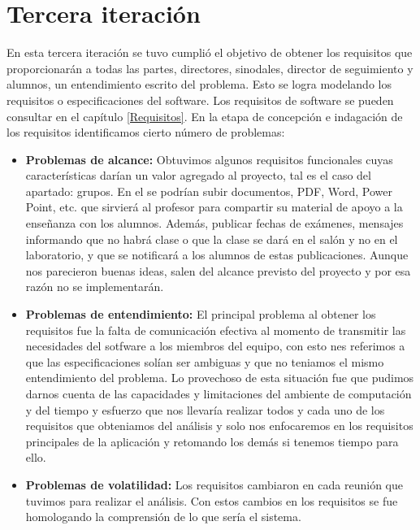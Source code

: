 \section{Tercera iteración}
\noindent
En esta tercera iteración se tuvo cumplió el objetivo de obtener los requisitos que proporcionarán a todas las partes, directores, sinodales, director de seguimiento y alumnos, un entendimiento escrito del problema. Esto se logra modelando los requisitos o especificaciones del software. Los requisitos de software se pueden consultar en el capítulo \ref{Requisitos}.
En la etapa de concepción e indagación de los requisitos identificamos cierto número de problemas:
\begin{itemize}
	\item \textbf{Problemas de alcance:} Obtuvimos algunos requisitos funcionales cuyas características darían un valor agregado al proyecto, tal es el caso del apartado: grupos. En el se podrían subir documentos, PDF, Word, Power Point, etc. que sirvierá al profesor para compartir su material de apoyo a la enseñanza con los alumnos. Además, publicar fechas de exámenes, mensajes informando que no habrá clase o que la clase se dará en el salón y no en el laboratorio, y que se notificará a los alumnos de estas publicaciones. Aunque nos parecieron buenas ideas, salen del alcance previsto del proyecto y por esa razón no se implementarán.
	\item \textbf{Problemas de entendimiento:} El principal problema al obtener los requisitos fue la falta de comunicación efectiva al momento de transmitir las necesidades del sotfware a los miembros del equipo, con esto nes referimos a que las especificaciones solían ser ambiguas y que no teniamos el mismo entendimiento del problema. Lo provechoso de esta situación fue que pudimos darnos cuenta de las capacidades y limitaciones del ambiente de computación y del tiempo y esfuerzo que nos llevaría realizar todos y cada uno de los requisitos que obteniamos del análisis y solo nos enfocaremos en los requisitos principales de la aplicación y retomando los demás si tenemos tiempo para ello.
	\item \textbf{Problemas de volatilidad:} Los requisitos cambiaron en cada reunión que tuvimos para realizar el análisis. Con estos cambios en los requisitos se fue homologando la comprensión de lo que sería el sistema.
\end{itemize}

